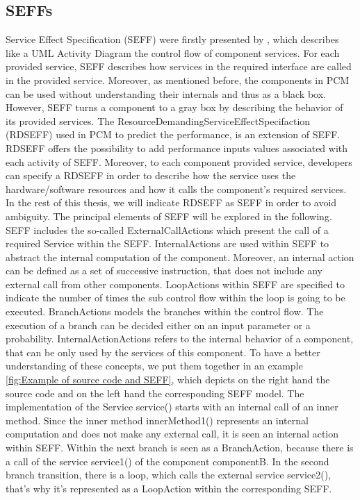 \subsection{SEFFs}
\label{sec: SEFFs}
Service Effect Specification (SEFF) were firstly presented by \cite{koziolek2006parameter}, which describes like a UML Activity Diagram the control flow of component services. For each provided service, SEFF describes how services in the required interface are called in the provided service. Moreover, as mentioned before, the components in PCM can be used without understanding their internals and thus as a black box. However, SEFF turns a component to a gray box by describing the behavior of its provided services.
The ResourceDemandingServiceEffectSpecifaction (RDSEFF) used in PCM to predict the performance, is an extension of SEFF. RDSEFF offers the possibility to add performance inputs values associated with each activity of SEFF. Moreover, to each component provided service, developers can specify a RDSEFF in order to describe how the service uses the hardware/software resources and how it calls the component's required services. 
In the rest of this thesis, we will indicate RDSEFF as SEFF in order to avoid ambiguity. The principal elements of SEFF will be explored in the following. SEFF includes the so-called ExternalCallActions which present the call of a required Service within the SEFF. InternalActions are used within SEFF to abstract the internal computation of the component. Moreover, an internal action can be defined as a set of successive instruction, that does not include any external call from other components. LoopActions within SEFF are specified to indicate the number of times the sub control flow within the loop is going to be executed. BranchActions models the branches within the control flow. The execution of a branch can be decided either on an input parameter or a probability. InternalActionActions refers to the internal behavior of a component, that can be only used by the services of this component. 
To have a better understanding of these concepts, we put them together in an example \ref{fig:Example of source code and SEFF}, which depicts on the right hand the source code and on the left hand the corresponding SEFF model. The implementation of the Service service() starts with an internal call of an inner method. Since the inner method innerMethod1() represents an internal computation and does not make any external call, it is seen an internal action within SEFF. Within the next branch is seen as a BranchAction, because there is a call of the service service1() of the component componentB. In the second branch transition, there is a loop, which calls the external service service2(), that’s why it’s represented as a LoopAction within the corresponding SEFF. 

